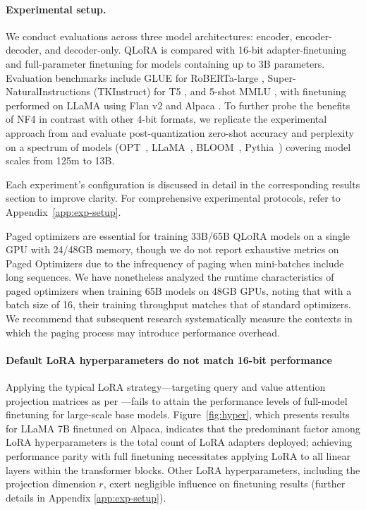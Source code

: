 \paragraph{Experimental setup.} We conduct evaluations across three model architectures: encoder, encoder-decoder, and decoder-only. QLoRA is compared with 16-bit adapter-finetuning and full-parameter finetuning for models containing up to 3B parameters. Evaluation benchmarks include GLUE \citep{wang2018glue} for RoBERTa-large \citep{liu2019roberta}, Super-NaturalInstructions (TKInstruct) \citep{wang2022super} for T5 \citep{t5}, and 5-shot MMLU \citep{hendrycksmeasuring}, with finetuning performed on LLaMA using Flan v2 \citep{longpre2023flan} and Alpaca \citep{alpaca}. To further probe the benefits of NF4 in contrast with other 4-bit formats, we replicate the experimental approach from \citet{dettmers2022case} and evaluate post-quantization zero-shot accuracy and perplexity on a spectrum of models (OPT~\citep{zhang2022opt}, LLaMA~\citep{touvron2023llama}, BLOOM~\citep{scao2022bloom}, Pythia~\citep{biderman2023pythia}) covering model scales from 125m to 13B.

Each experiment’s configuration is discussed in detail in the corresponding results section to improve clarity. For comprehensive experimental protocols, refer to Appendix~\ref{app:exp-setup}.

Paged optimizers are essential for training 33B/65B \textsc{QLoRA} models on a single GPU with 24/48GB memory, though we do not report exhaustive metrics on Paged Optimizers due to the infrequency of paging when mini-batches include long sequences. We have nonetheless analyzed the runtime characteristics of paged optimizers when training 65B models on 48GB GPUs, noting that with a batch size of 16, their training throughput matches that of standard optimizers. We recommend that subsequent research systematically measure the contexts in which the paging process may introduce performance overhead.

\paragraph{Default LoRA hyperparameters do not match 16-bit performance}

Applying the typical LoRA strategy—targeting query and value attention projection matrices as per \citet{hu2021lora}—fails to attain the performance levels of full-model finetuning for large-scale base models. Figure~\ref{fig:hyper}, which presents results for LLaMA 7B finetuned on Alpaca, indicates that the predominant factor among LoRA hyperparameters is the total count of LoRA adapters deployed; achieving performance parity with full finetuning necessitates applying LoRA to all linear layers within the transformer blocks. Other LoRA hyperparameters, including the projection dimension $r$, exert negligible influence on finetuning results (further details in Appendix \ref{app:exp-setup}).

